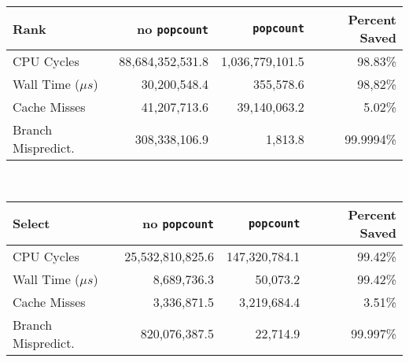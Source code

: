 \begin{tabular}{|l|r|r|r|}
\hline
\textbf{Rank}						& no \texttt{popcount}	& \texttt{popcount}	& Percent Saved \\ \hline
CPU Cycles 				& 88,684,352,531.8	& 1,036,779,101.5	& 98.83\% \\ \hline
Wall Time ($\mu s$)		& 30,200,548.4		& 355,578.6			& 98,82\% \\ \hline
Cache Misses				& 41,207,713.6		& 39,140,063.2		& 5.02\% \\ \hline
Branch Mispredict.		& 308,338,106.9		& 1,813.8			& 99.9994\% \\ \hline
\end{tabular}\\[5pt]

\begin{tabular}{|l|r|r|r|}
\hline
\textbf{Select}						& no \texttt{popcount}	& \texttt{popcount}	& Percent Saved \\ \hline
CPU Cycles 				& 25,532,810,825.6	& 147,320,784.1	& 99.42\% \\ \hline
Wall Time ($\mu s$)		& 8,689,736.3		& 50,073.2		& 99.42\% \\ \hline
Cache Misses				& 3,336,871.5		& 3,219,684.4	& 3.51\% \\ \hline
Branch Mispredict.		& 820,076,387.5		& 22,714.9		& 99.997\% \\ \hline
\end{tabular}